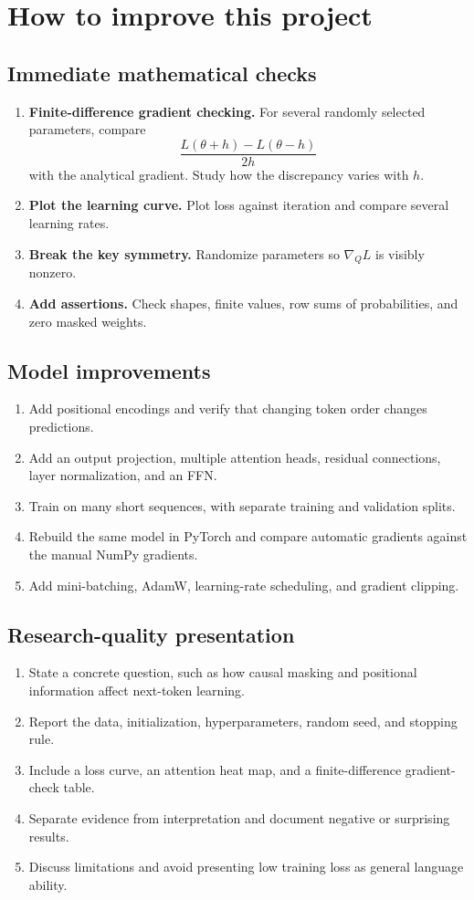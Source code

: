\documentclass[11pt]{article}
\newcommand{\grad}{\nabla}
\begin{document}
\section{How to improve this project}

\subsection{Immediate mathematical checks}
\begin{enumerate}
  \item \textbf{Finite-difference gradient checking.} For several randomly selected parameters, compare
  \[
    \frac{L(\theta+h)-L(\theta-h)}{2h}
  \]
  with the analytical gradient. Study how the discrepancy varies with $h$.
  \item \textbf{Plot the learning curve.} Plot loss against iteration and compare several learning rates.
  \item \textbf{Break the key symmetry.} Randomize parameters so $\grad_Q L$ is visibly nonzero.
  \item \textbf{Add assertions.} Check shapes, finite values, row sums of probabilities, and zero masked weights.
\end{enumerate}

\subsection{Model improvements}
\begin{enumerate}
  \item Add positional encodings and verify that changing token order changes predictions.
  \item Add an output projection, multiple attention heads, residual connections, layer normalization, and an FFN.
  \item Train on many short sequences, with separate training and validation splits.
  \item Rebuild the same model in PyTorch and compare automatic gradients against the manual NumPy gradients.
  \item Add mini-batching, AdamW, learning-rate scheduling, and gradient clipping.
\end{enumerate}

\subsection{Research-quality presentation}
\begin{enumerate}
  \item State a concrete question, such as how causal masking and positional information affect next-token learning.
  \item Report the data, initialization, hyperparameters, random seed, and stopping rule.
  \item Include a loss curve, an attention heat map, and a finite-difference gradient-check table.
  \item Separate evidence from interpretation and document negative or surprising results.
  \item Discuss limitations and avoid presenting low training loss as general language ability.
\end{enumerate}
\end{document}
